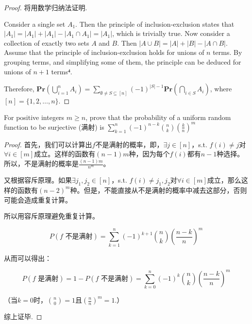 \documentclass[12pt, a4paper, oneside]{ctexart}
\begin{document}
\begin{proof}

  将用数学归纳法证明.

  Consider a single set $A_1$. Then the principle of inclusion-exclusion states that $|A_1| = |A_1| + | A_1 | - | A_1 \cap A_1 | = | A_1 |$, which is trivially true. Now consider a collection of exactly two sets $A$ and $B$. Then $|A \cup B| = |A| + |B| - |A \cap B|$. Assume that the principle of inclusion-exclusion holds for unions of $n$ terms. By grouping terms, and simplifying some of them, the principle can be deduced for unions of $n+1$ terms⁴.

  Therefore, $\mathbf{Pr}\left( \bigcup_{i=1}^n A_i\right) = \sum_{\emptyset \neq S \subseteq [n]} (-1)^{|S|-1} \mathbf{Pr}\left( \bigcap_{i \in S} A_i \right) $, where $[n]=\{1,2,\ldots,n\}$.


\end{proof}


\begin{problem}
For positive integers $\displaystyle{ m\ge n }$, prove that the probability of a uniform random function to be surjective (满射) is $\displaystyle{ \sum_{k=1}^n(-1)^{n-k}{n\choose k}\left(\frac{k}{n}\right)^m }$

\end{problem}

\begin{proof}
  首先，我们可以计算出$f$不是满射的概率，即，$\exists j\in[n]$，s.t. $f(i)\neq j$对$\forall i\in[m]$成立。这样的函数有$(n-1)m$种，因为每个$f(i)$都有$n-1$种选择。所以，不是满射的概率是$\frac{(n-1)m}{n^m}$。

  又根据容斥原理。如果$\exists j_1,j_2\in[n]$，s.t. $f(i)\neq j_1,j_2$对$\forall i\in[m]$成立，那么这样的函数有$(n-2)^m$种。但是，不能直接从不是满射的概率中减去这部分，否则可能会造成重复计算。

  所以用容斥原理避免重复计算。

  $$ P(f \text{ 不是满射}) = \sum_{k=1}^n (-1)^{k+1} {n \choose k} \left(\frac{n-k}{n}\right)^m $$

  从而可以得出：

  $$ P(f \text{ 是满射}) = 1 - P(f \text{ 不是满射}) = \sum_{k=0}^n (-1)^k {n \choose k} \left(\frac{n-k}{n}\right)^m $$

  （当$k=0$时，${n \choose 0}=1$且$\left(\frac{n}{n}\right)^m=1$.）

  综上证毕.

\end{proof}
\end{document}
